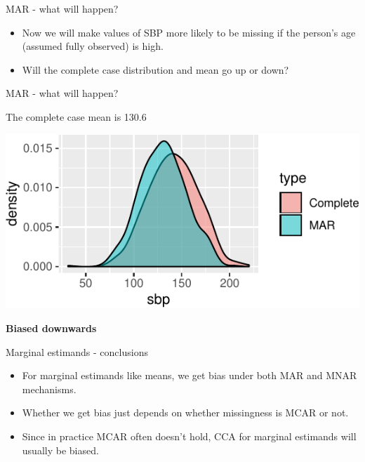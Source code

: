 \documentclass[ignorenonframetext,]{beamer}
\providecommand{\tightlist}{%
  \setlength{\itemsep}{0pt}\setlength{\parskip}{0pt}}
\begin{document}
\begin{frame}{MAR - what will happen?}
\protect\hypertarget{mar---what-will-happen}{}

\begin{itemize}
\tightlist
\item
  Now we will make values of SBP more likely to be missing if the
  person's age (assumed fully observed) is high.
\item
  Will the complete case distribution and mean go up or down?
\end{itemize}

\end{frame}

\begin{frame}{MAR - what will happen?}
\protect\hypertarget{mar---what-will-happen-1}{}

The complete case mean is 130.6

\begin{center}\includegraphics{Lecture2_files/figure-beamer/unnamed-chunk-8-1} \end{center}

\textbf{Biased downwards}

\end{frame}

\begin{frame}{Marginal estimands - conclusions}
\protect\hypertarget{marginal-estimands---conclusions}{}

\begin{itemize}
\tightlist
\item
  For marginal estimands like means, we get bias under both MAR and MNAR
  mechanisms.
\item
  Whether we get bias just depends on whether missingness is MCAR or
  not.
\item
  Since in practice MCAR often doesn't hold, CCA for marginal estimands
  will usually be biased.
\end{itemize}

\end{frame}
\end{document}

